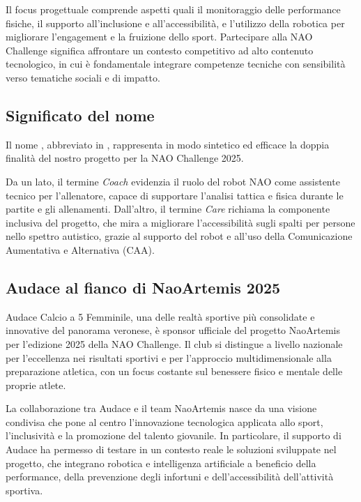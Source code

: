 \documentclass{optica-article}
\begin{document}
Il focus progettuale comprende aspetti quali il monitoraggio delle performance fisiche, il supporto all'inclusione e all'accessibilit\`a, e l'utilizzo della robotica per migliorare l'engagement e la fruizione dello sport. Partecipare alla NAO Challenge significa affrontare un contesto competitivo ad alto contenuto tecnologico, in cui \`e fondamentale integrare competenze tecniche con sensibilit\`a verso tematiche sociali e di impatto.

\subsection{Significato del nome }

Il nome , abbreviato in , rappresenta in modo sintetico ed efficace la doppia finalità del nostro progetto per la NAO Challenge 2025. 

Da un lato, il termine \textit{Coach} evidenzia il ruolo del robot NAO come assistente tecnico per l’allenatore, capace di supportare l’analisi tattica e fisica durante le partite e gli allenamenti. Dall’altro, il termine \textit{Care} richiama la componente inclusiva del progetto, che mira a migliorare l’accessibilità sugli spalti per persone nello spettro autistico, grazie al supporto del robot e all’uso della Comunicazione Aumentativa e Alternativa (CAA).


\subsection{Audace al fianco di NaoArtemis 2025}
Audace Calcio a 5 Femminile, una delle realt\`a sportive pi\`u consolidate e innovative del panorama veronese, \`e sponsor ufficiale del progetto NaoArtemis per l'edizione 2025 della NAO Challenge. Il club si distingue a livello nazionale per l'eccellenza nei risultati sportivi e per l'approccio multidimensionale alla preparazione atletica, con un focus costante sul benessere fisico e mentale delle proprie atlete.

La collaborazione tra Audace e il team NaoArtemis nasce da una visione condivisa che pone al centro l'innovazione tecnologica applicata allo sport, l'inclusivit\`a e la promozione del talento giovanile. In particolare, il supporto di Audace ha permesso di testare in un contesto reale le soluzioni sviluppate nel progetto, che integrano robotica e intelligenza artificiale a beneficio della performance, della prevenzione degli infortuni e dell'accessibilit\`a dell'attivit\`a sportiva.
\end{document}
